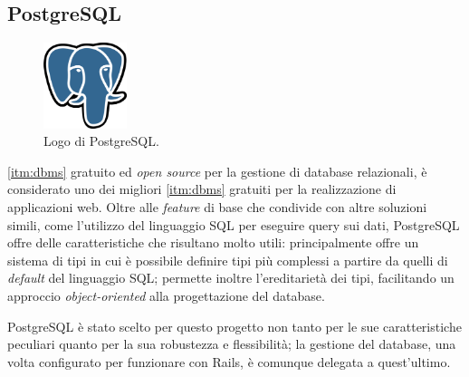 \subsection{PostgreSQL}
\begin{figure}[h!]
    \centering
    \includegraphics[height=2.5cm]{figures/postgres.png}
    \caption[Logo di PostgreSQL]{Logo di PostgreSQL.
    \label{fig:posgres}}
\end{figure}
\ref{itm:dbms} gratuito ed \textit{open source} per la gestione di database relazionali, è considerato uno dei migliori \ref{itm:dbms} gratuiti per la realizzazione di applicazioni web. Oltre alle \textit{feature} di base che condivide con altre soluzioni simili, come l'utilizzo del linguaggio SQL per eseguire query sui dati, PostgreSQL offre delle caratteristiche che risultano molto utili: principalmente offre un sistema di tipi in cui è possibile definire tipi più complessi a partire da quelli di \textit{default} del linguaggio SQL;  permette inoltre l'ereditarietà dei tipi, facilitando un approccio \textit{object-oriented} alla progettazione del database.

PostgreSQL è stato scelto per questo progetto non tanto per le sue caratteristiche peculiari quanto per la sua robustezza e flessibilità; la gestione del database, una volta configurato per funzionare con Rails, è comunque delegata a quest'ultimo.






